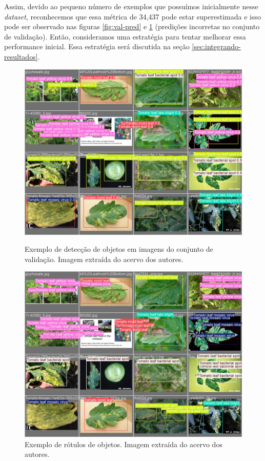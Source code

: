 Assim, devido ao pequeno número de exemplos que possuímos inicialmente nesse \emph{dataset}, reconhecemos que essa métrica de 34,437 pode estar superestimada e isso pode ser observado nas figuras \ref{fig:val-pred} e \ref{fig:val-labels} (predições incorretas no conjunto de validação). Então, consideramos uma estratégia para tentar melhorar essa performance inicial. Essa estratégia será discutida na seção \ref{sec:integrando-resultados}.

\begin{figure}[htb!]
    \centering
    \begin{minipage}[t]{0.45\textwidth}
        \centering
        \includegraphics[width=\textwidth]{images/val_batch0_pred.jpg}
        \caption{\label{fig:val-pred} Exemplo de detecção de objetos em imagens do conjunto de validação. Imagem extraída do acervo dos autores.}

    \end{minipage}\hfill
    \begin{minipage}[t]{0.45\textwidth}
        \centering
        \includegraphics[width=\textwidth]{images/val_batch0_labels.jpg}
        \caption{\label{fig:val-labels} Exemplo de rótulos de objetos. Imagem extraída do acervo dos autores.}

    \end{minipage}
\end{figure}